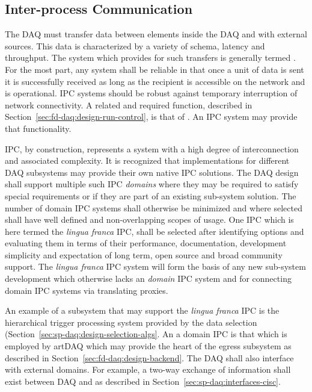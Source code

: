 \subsection{Inter-process Communication}
\label{sec:fd-daq:design-messages}

The DAQ must transfer data between elements inside the DAQ and with external sources. 
This data is characterized by a variety of schema, latency and throughput. 
The system which provides for such transfers is generally termed .
For the most part, any  system shall be reliable in that once a unit of data is sent it is successfully received as long as the recipient is accessible on the network and is operational. 
IPC systems should be robust against temporary interruption of network connectivity. 
A related and required function, described in Section~\ref{sec:fd-daq:design-run-control}, is that of . 
An IPC system may provide that functionality.

IPC, by construction, represents a system with a high degree of interconnection and associated complexity. 
It is recognized that implementations for different DAQ subsystems may provide their own native IPC solutions. 
The DAQ design shall support multiple such IPC \textit{domains} where they may be required to satisfy special requirements or if they are part of an existing sub-system solution. 
The number of domain IPC systems shall otherwise be minimized and where selected shall have well defined and non-overlapping scopes of usage. 
One IPC which is here termed the \textit{lingua franca} IPC, shall be selected after identifying options and evaluating them in terms of their performance, documentation, development simplicity and expectation of long term, open source and broad community support. 
The \textit{lingua franca} IPC system will form the basis of any new sub-system development which otherwise lacks an \textit{domain} IPC system and for connecting domain IPC systems via translating proxies.

An example of a subsystem that may support the \textit{lingua franca} IPC is the hierarchical trigger processing system provided by the data selection (Section~\ref{sec:sp-daq:design-selection-algs}. 
An a domain IPC is that which is employed by artDAQ which may provide the heart of the egress subsystem as described in Section~\ref{sec:fd-daq:design-backend}.
The DAQ shall also interface with external domains. 
For example, a two-way exchange of information shall exist between DAQ and  as described in Section~\ref{sec:sp-daq:interfaces-cisc}.  

